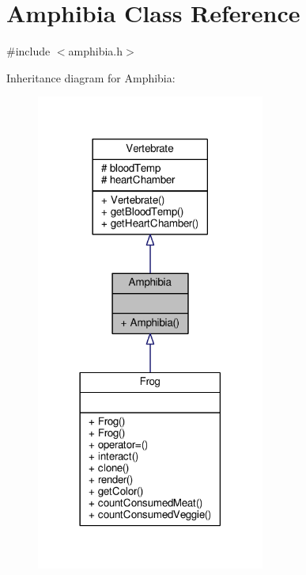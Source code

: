 \hypertarget{classAmphibia}{}\section{Amphibia Class Reference}
\label{classAmphibia}


{\ttfamily \#include $<$amphibia.\+h$>$}



Inheritance diagram for Amphibia\+:
\nopagebreak
\begin{figure}[H]
\begin{center}
\leavevmode
\includegraphics[width=213pt]{classAmphibia__inherit__graph}
\end{center}
\end{figure}


